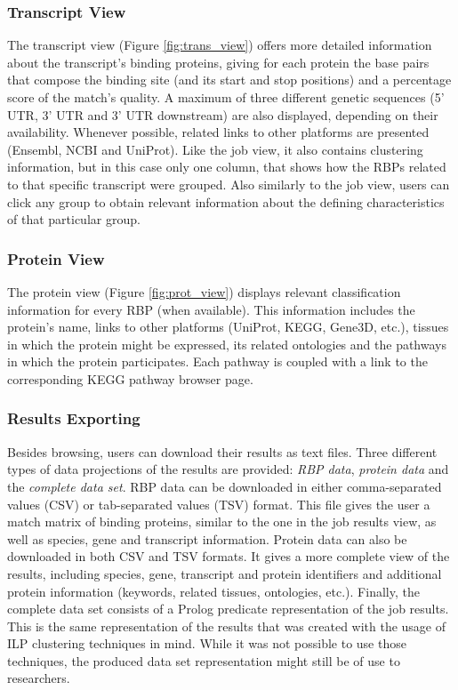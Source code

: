 \subsubsection*{Transcript View}

The transcript view (Figure \ref{fig:trans_view}) offers more detailed
information about the transcript's binding proteins, giving for each protein the
base pairs that compose the binding site (and its start and stop positions) and
a percentage score of the match's quality. A maximum of three different genetic
sequences (5’ UTR, 3’ UTR and 3’ UTR downstream) are also displayed, depending
on their availability. Whenever possible, related links to other platforms are
presented (Ensembl, NCBI and UniProt). Like the job view, it also contains
clustering information, but in this case only one column, that shows how the
RBPs related to that specific transcript were grouped. Also similarly to the job
view, users can click any group to obtain relevant information about the
defining characteristics of that particular group.

\subsubsection*{Protein View}

The protein view (Figure \ref{fig:prot_view}) displays relevant classification
information for every RBP (when available). This information includes the
protein's name, links to other platforms (UniProt, KEGG, Gene3D, etc.), tissues
in which the protein might be expressed, its related ontologies and the pathways
in which the protein participates. Each pathway is coupled with a link to the
corresponding KEGG pathway browser page.

\subsubsection*{Results Exporting}

Besides browsing, users can download their results as text files. Three
different types of data projections of the results are provided: \emph{RBP
data}, \emph{protein data} and the \emph{complete data set}. RBP data can be
downloaded in either comma-separated values (CSV) or tab-separated values (TSV)
format. This file gives the user a match matrix of binding proteins, similar to
the one in the job results view, as well as species, gene and transcript
information. Protein data can also be downloaded in both CSV and TSV formats. It
gives a more complete view of the results, including species, gene, transcript
and protein identifiers and additional protein information (keywords, related
tissues, ontologies, etc.). Finally, the complete data set consists of a Prolog
predicate representation of the job results. This is the same representation of
the results that was created with the usage of ILP clustering techniques in
mind. While it was not possible to use those techniques, the produced data set
representation might still be of use to researchers.

